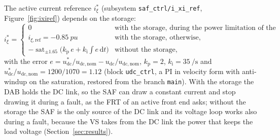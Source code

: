 \documentclass[11pt,a4paper]{scrartcl}
\newcommand{\ped}[1]{_{\mathrm{#1}}}
\newcommand{\code}[1]{\texttt{#1}}
\begin{document}
\begin{onehalfspace}
The active current reference $i_\xi^*$ (subsystem \code{saf\_ctrl/i\_xi\_ref}, Figure~\ref{fig:ixiref}) depends on the storage:
\begin{equation}
	i_\xi^* =
	\begin{cases}
		0 & \text{with the storage, during the power limitation of the FRT,} \\
		i_{\xi,\mathrm{ref}} = \SI{-0.85}{pu} & \text{with the storage, otherwise,} \\
		-\operatorname{sat}_{\pm 1.65}\!\big(k\ped{p}\,e + k\ped{i} \textstyle\int e\,\mathrm{d}t\big) & \text{without the storage,}
	\end{cases}
	\label{eq:ixi}
\end{equation}
with the error $e = u\ped{dc}^*/u\ped{dc,nom} - u\ped{dc}/u\ped{dc,nom}$, $k\ped{p} = 2$, $k\ped{i} = \SI{35}{\per\second}$ and $u\ped{dc}^*/u\ped{dc,nom} = 1200/1070 = 1.12$ (block \code{udc\_ctrl}, a PI in velocity form with anti-windup on the saturation, restored from the branch \code{main}). With the storage the DAB holds the DC link, so the SAF can draw a constant current and stop drawing it during a fault, as the FRT of an active front end asks; without the storage the SAF is the only source of the DC link and its voltage loop works also during a fault, because the VS takes from the DC link the power that keeps the load voltage (Section~\ref{sec:results}).


\end{onehalfspace}
\end{document}
